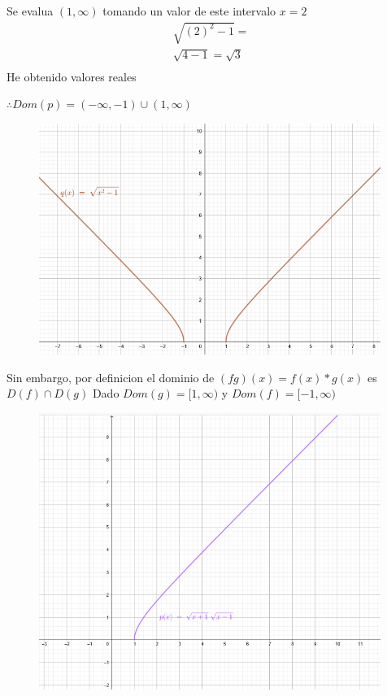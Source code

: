 \documentclass[12pt, letterpaper]{article}
\begin{document}
Se evalua $(1, \infty)$ tomando un valor de este intervalo $x = 2$
\begin{align*}
	\sqrt{(2)^2-1}=\\
	\sqrt{4 - 1} = \sqrt{3}\\
\end{align*}
He obtenido valores reales 

$\therefore Dom(p) = (-\infty, -1) \cup (1, \infty)$

\begin{figure}[h]
\centering
\includegraphics[width=30em]{t6cuatro}
\end{figure}

Sin embargo, por definicion el dominio de $(fg)(x)=f (x)* g(x)$ es $D(f) \cap D(g)$
Dado $Dom(g) = [1, \infty)$ y $Dom(f) = [-1, \infty)$


\begin{figure}[h]
\centering
\includegraphics[width=30em]{t6cinco}
\end{figure}
\end{document}
